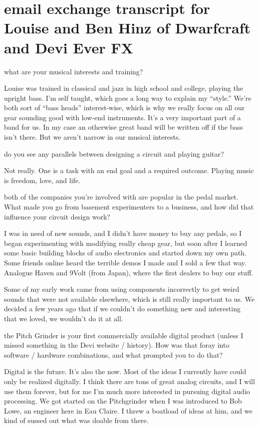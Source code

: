 \section{email exchange transcript for Louise and Ben Hinz of Dwarfcraft and Devi Ever FX}

what are your musical interests and training? 

Louise was trained in classical and jazz in high school and college, playing
the upright bass. I'm self taught, which goes a long way to explain my “style.” 
We're both sort of “bass heads” interest-wise, which is why we really focus on all 
our gear sounding good with low-end instruments. It's a very important part of a 
band for us. In my case an otherwise great band will be written off if the bass isn’t 
there. But we aren’t narrow in our musical interests.

do you see any parallels between designing a circuit and playing guitar? 

Not really. One is a task with an end goal and a required outcome. Playing 
music is freedom, love, and life.

both of the companies you're involved with are popular in the pedal market. What made you go from basement experimenters to a business, and how did that influence your circuit design work? 

I was in need of new sounds, and I didn't have money to buy any pedals, 
so I began experimenting with modifying really cheap gear, but soon after I 
learned some basic building blocks of audio electronics and started down my 
own path.  Some friends online heard the terrible demos I made and I sold a few 
that way.  Analogue Haven and 9Volt (from Japan), where the first dealers to buy 
our stuff. 

Some of my early work came from using components incorrectly to get  weird sounds that were not available elsewhere, which is still really important to 
us. We decided a few years ago that if we couldn’t do something new and 
interesting that we loved, we wouldn’t do it at all. 

the Pitch Grinder is your first commercially available digital product
(unless I missed something in the Devi website / history). How was
that foray into software / hardware combinations, and what prompted
you to do that? 

Digital is the future. It's also the now. Most of the ideas I currently have 
could only be realized digitally. I think there are tons of great analog circuits, and 
I will use them forever, but for me I'm much more interested in pursuing digital 
audio processing. We got started on the Pitchgrinder when I was introduced to 
Bob Lowe, an engineer here in Eau Claire. I threw a boatload of ideas at him, 
and we kind of sussed out what was doable from there.


